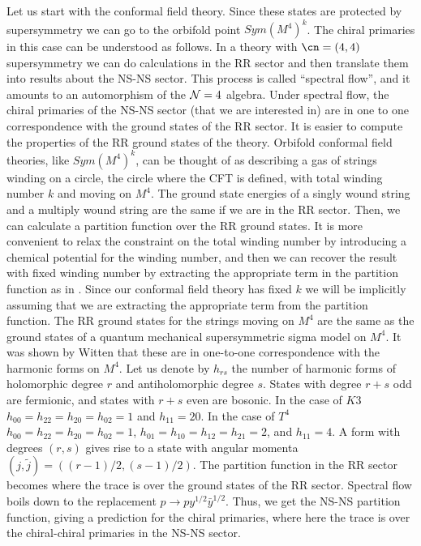 Let us start with the conformal field theory. Since these states
are protected by supersymmetry we can go to the orbifold point
 $Sym(M^4)^k$. The chiral primaries in this case can be understood 
as follows. In a theory with $\cn=(4,4)$ 
supersymmetry we can do calculations
in the RR sector and then translate them into results about the
NS-NS sector. This process is called ``spectral flow'', and it 
amounts to an automorphism of the ${\cal N} = 4$ algebra. 
Under spectral flow, the chiral primaries of the NS-NS sector (that 
we are interested in) are in one
to one correspondence with the ground states of the RR sector.
It is easier to compute the properties of the RR ground states of
the theory. Orbifold conformal field theories, like $Sym(M^4)^k$, can
be thought of as describing a gas of strings winding on a circle,
the circle where the CFT is defined, with total winding
number $k$ and moving on $M^4$. 
The ground state energies
 of a singly wound string and a multiply wound
string are the same if we are in the RR sector. 
Then, we can calculate a partition function over the RR ground states.
It is more convenient to relax the constraint on the  total winding 
number by introducing a chemical potential for the winding number,
and then we can recover the result with fixed winding number by extracting 
 the appropriate term in the partition function as in 
\cite{Dijkgraaf:1996xw}. 
Since our conformal field theory has fixed $k$ we will be implicitly 
assuming that we are extracting the appropriate term  from the 
partition function. 
The RR ground states for the strings moving on $M^4$ are the same
as the ground states of a quantum mechanical supersymmetric sigma 
model on $M^4$. It was shown by Witten \cite{Witten:1982df}
 that these are in 
one-to-one correspondence with the harmonic forms on $M^4$.
Let us denote by $h_{rs}$ the number of harmonic forms of holomorphic
degree $r$ and antiholomorphic degree $s$. States with
degree $r+s$ odd are fermionic, and states with $r+s$ even are bosonic.
In the case of $K3$ $h_{00} = h_{22} = h_{20}=h_{02}=1$ and 
$h_{11} = 20$. In the case of $T^4$ $h_{00} = h_{22} = h_{20}=h_{02}=1$,
$h_{01}= h_{10} = h_{12} = h_{21} = 2 $, and $h_{11} = 4$. 
A form with degrees $(r,s)$  gives rise to a state with 
angular momenta $ (j,\tilde j) = ( (r-1)/2,(s-1)/2)$.
The partition function in the RR sector  becomes \cite{Dijkgraaf:1996xw}
where the trace is over the ground states of the RR sector.
Spectral flow boils down to the replacement 
$p\to p y^{1/2} {\bar y}^{1/2}$. Thus, we get the NS-NS partition function,
giving a prediction for the chiral primaries,
where here the trace is over the chiral-chiral primaries in the NS-NS
sector.

